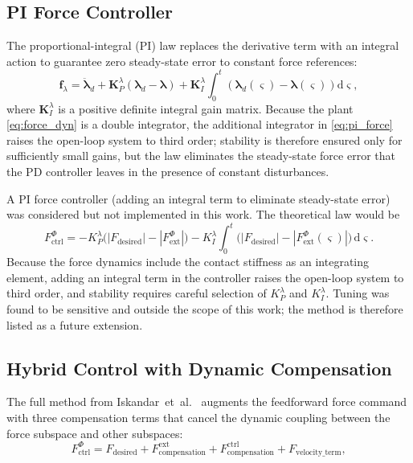 \documentclass[
	german,%
	accentcolor=9c,%
	ruledheaders=section,%
	class=report,%
	thesis={type=bachelor},%
	fontsize=11pt,%
	parskip=half-,%
	custommargins=true,%
	marginpar=false,%
]{tudapub}
\begin{document}
\subsection{PI Force Controller}
\label{sec:pi_force}

The proportional-integral (PI) law replaces the derivative term with
an integral action to guarantee zero steady-state error to constant
force references:
%
\begin{equation}
    \mathbf{f}_{\lambda}
    = \ddot{\boldsymbol{\lambda}}_d
    + \mathbf{K}_{P}^{\lambda}
        \left(\boldsymbol{\lambda}_d - \boldsymbol{\lambda}\right)
    + \mathbf{K}_{I}^{\lambda}
        \int_{0}^{t}
            \left(\boldsymbol{\lambda}_d(\varsigma)
                  - \boldsymbol{\lambda}(\varsigma)\right)\mathrm{d}\varsigma,
    \label{eq:pi_force}
\end{equation}
%
where $\mathbf{K}_{I}^{\lambda}$ is a positive definite integral gain
matrix. Because the plant \eqref{eq:force_dyn} is a double integrator,
the additional integrator in \eqref{eq:pi_force} raises the open-loop
system to third order; stability is therefore ensured only for
sufficiently small gains, but the law eliminates the steady-state force
error that the PD controller leaves in the presence of constant disturbances.

A PI force controller (adding an integral term to eliminate steady-state
error) was considered but not implemented in this work.
The theoretical law would be
\begin{equation}
    F^\Phi_\text{ctrl}
    = -K_P^\lambda \bigl(|F_\text{desired}| - |F^\Phi_\text{ext}|\bigr)
      - K_I^\lambda \int_0^t
            \bigl(|F_\text{desired}| - |F^\Phi_\text{ext}(\varsigma)|\bigr)
            \,\mathrm{d}\varsigma.
\end{equation}
Because the force dynamics include the contact stiffness as an integrating
element, adding an integral term in the controller raises the open-loop
system to third order, and stability requires careful selection of
\(K_P^\lambda\) and \(K_I^\lambda\).
Tuning was found to be sensitive and outside the scope of this work;
the method is therefore listed as a future extension.

\subsection{Hybrid Control with Dynamic Compensation}
\label{sec:paper_method}

The full method from Iskandar~et~al.~\cite{iskandar_hybrid_2023} augments the
feedforward force command with three compensation terms that cancel the
dynamic coupling between the force subspace and other subspaces:
\begin{equation}
    F^\Phi_\text{ctrl}
    = F_\text{desired}
      + {F}^{\text{ext}}_{\text{compensation}}
      + {F}^{\text{ctrl}}_{\text{compensation}}
      + {F}_{\text{velocity\_term}},
    \label{eq:paper_method}
\end{equation}
\end{document}
